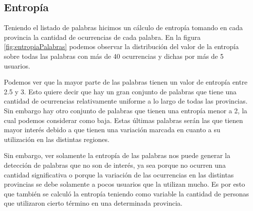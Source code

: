 







\subsection{Entropía}
Teniendo el listado de palabras hicimos un cálculo de entropía tomando en cada provincia la cantidad de ocurrencias de cada palabra. En la figura \ref{fig:entropiaPalabras} podemos observar la distribución del valor de la entropía sobre todas las palabras con más de 40 ocurrencias y dichas por más de 5 usuarios.

Podemos ver que la mayor parte de las palabras tienen un valor de entropía entre 2.5 y 3. Esto quiere decir que hay un gran conjunto de palabras que tiene una cantidad de ocurrencias relativamente uniforme a lo largo de todas las provincias. Sin embargo hay otro conjunto de palabras que tienen una entropía menor a 2, la cual podemos considerar como baja. Estas últimas palabras serán las que tienen mayor interés debido a que tienen una variación marcada en cuanto a su utilización en las distintas regiones.

Sin embargo, ver solamente la entropía de las palabras nos puede generar la detección de palabras que no son de interés, ya sea porque no ocurren una cantidad significativa o porque la variación de las ocurrencias en las distintas provincias se debe solamente a pocos usuarios que la utilizan mucho. Es por esto que también se calculó la entropía teniendo como variable la cantidad de personas que utilizaron cierto término en una determinada provincia.


